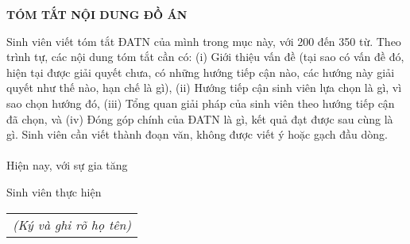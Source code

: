 \documentclass[../DoAn.tex]{subfiles}
\begin{document}
\begin{center}
    \Large{\textbf{TÓM TẮT NỘI DUNG ĐỒ ÁN}}\\
\end{center}
\vspace{1cm}
Sinh viên viết tóm tắt ĐATN của mình trong mục này, với 200 đến 350 từ. Theo trình tự, các nội dung tóm tắt cần có: (i) Giới thiệu vấn đề (tại sao có vấn đề đó, hiện tại được giải quyết chưa, có những hướng tiếp cận nào, các hướng này giải quyết như thế nào, hạn chế là gì), (ii) Hướng tiếp cận sinh viên lựa chọn là gì, vì sao chọn hướng đó, (iii) Tổng quan giải pháp của sinh viên theo hướng tiếp cận đã chọn, và (iv) Đóng góp chính của ĐATN là gì, kết quả đạt được sau cùng là gì. Sinh viên cần viết thành đoạn văn, không được viết ý hoặc gạch đầu dòng.
\\\\
Hiện nay, với sự gia tăng 
\begin{flushright}
Sinh viên thực hiện\\
\begin{tabular}{@{}c@{}}
\textit{(Ký và ghi rõ họ tên)}
\end{tabular}
\end{flushright}
\end{document}
